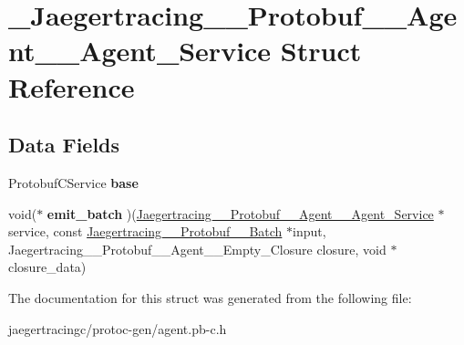 \hypertarget{struct__Jaegertracing____Protobuf____Agent____Agent__Service}{}\section{\+\_\+\+Jaegertracing\+\_\+\+\_\+\+Protobuf\+\_\+\+\_\+\+Agent\+\_\+\+\_\+\+Agent\+\_\+\+Service Struct Reference}
\label{struct__Jaegertracing____Protobuf____Agent____Agent__Service}
\subsection*{Data Fields}
\begin{DoxyCompactItemize}
\item 
\mbox{\label{struct__Jaegertracing____Protobuf____Agent____Agent__Service_a4e4305931072afa875b231081dc6e768}} 
Protobuf\+C\+Service {\bfseries base}
\item 
\mbox{\label{struct__Jaegertracing____Protobuf____Agent____Agent__Service_a3ddce21b0ab15181f4cb9a55fc8e1ed9}} 
void($\ast$ {\bfseries emit\+\_\+batch} )(\mbox{\hyperlink{struct__Jaegertracing____Protobuf____Agent____Agent__Service}{Jaegertracing\+\_\+\+\_\+\+Protobuf\+\_\+\+\_\+\+Agent\+\_\+\+\_\+\+Agent\+\_\+\+Service}} $\ast$service, const \mbox{\hyperlink{struct__Jaegertracing____Protobuf____Batch}{Jaegertracing\+\_\+\+\_\+\+Protobuf\+\_\+\+\_\+\+Batch}} $\ast$input, Jaegertracing\+\_\+\+\_\+\+Protobuf\+\_\+\+\_\+\+Agent\+\_\+\+\_\+\+Empty\+\_\+\+Closure closure, void $\ast$closure\+\_\+data)
\end{DoxyCompactItemize}


The documentation for this struct was generated from the following file\+:\begin{DoxyCompactItemize}
\item 
jaegertracingc/protoc-\/gen/agent.\+pb-\/c.\+h\end{DoxyCompactItemize}
